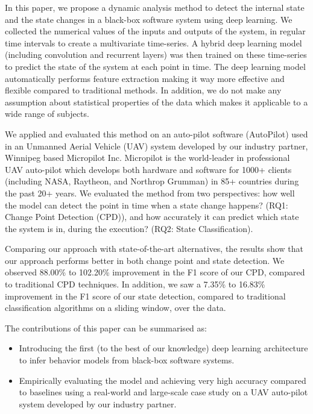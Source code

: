 In this paper, we propose a dynamic analysis method to detect the internal state and the state changes in a black-box software system using deep learning. We collected the numerical values of the inputs and outputs of the system, in regular time intervals to create a multivariate time-series. A hybrid deep learning model (including convolution and recurrent layers) was then trained on these time-series to predict the state of the system at each point in time. The deep learning model automatically performs feature extraction making it way more effective and flexible compared to traditional methods. In addition, we do not make any assumption about statistical properties of the data which makes it applicable to a wide range of subjects.   

We applied and evaluated this method on an auto-pilot software (AutoPilot) used in an Unmanned Aerial Vehicle (UAV) system developed by our industry partner, Winnipeg based Micropilot Inc. Micropilot is the world-leader in professional UAV auto-pilot which develops both hardware and software for 1000+ clients (including NASA, Raytheon, and Northrop Grumman) in 85+ countries during the past 20+ years. 
We evaluated the method from two perspectives: how well the model can detect the point in time when a state change happens? (RQ1: Change Point Detection (CPD)), and how accurately it can predict which state the system is in, during the execution? (RQ2: State Classification). 



Comparing our approach with state-of-the-art alternatives, the results show that our approach performs better in both change point and state detection. We observed 88.00\% to 102.20\% improvement in the F1 score of our CPD, compared to traditional CPD techniques. In addition, we saw a 7.35\% to 16.83\% improvement in the F1 score of our state detection, compared to traditional classification algorithms on a sliding window, over the data.


The contributions of this paper can be summarised as:
\begin{itemize}
    \item Introducing the first (to the best of our knowledge) deep learning architecture to infer behavior models from black-box software systems.
    \item Empirically evaluating the model and achieving very high accuracy compared to baselines using a real-world and large-scale case study on a UAV auto-pilot system developed by our industry partner.
\end{itemize}

